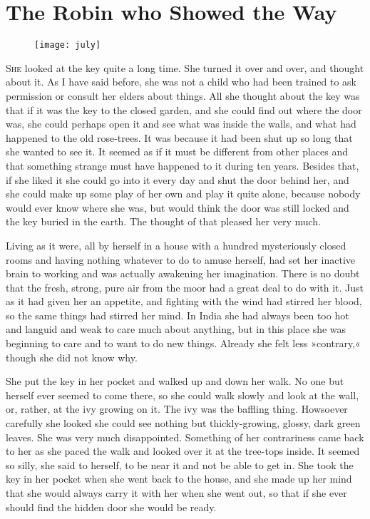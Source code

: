 \chapter{The Robin who Showed the Way} 
	
\begin{figure}[t!]
\centering
\texttt{[image: july]}
\end{figure}

 \lettrine[lines=6]{S}{he} looked at the key quite a long time. She turned it over and over, and thought about it. As I have said before, she was not a child who had been trained to ask permission or consult her elders about things. All she thought about the key was that if it was the key to the closed garden, and she could find out where the door was, she could perhaps open it and see what was inside the walls, and what had happened to the old rose-trees. It was because it had been shut up so long that she wanted to see it. It seemed as if it must be different from other places and that something strange must have happened to it during ten years. Besides that, if she liked it she could go into it every day and shut the door behind her, and she could make up some play of her own and play it quite alone, because nobody would ever know where she was, but would think the door was still locked and the key buried in the earth. The thought of that pleased her very much.

Living as it were, all by herself in a house with a hundred mysteriously closed rooms and having nothing whatever to do to amuse herself, had set her inactive brain to working and was actually awakening her imagination. There is no doubt that the fresh, strong, pure air from the moor had a great deal to do with it. Just as it had given her an appetite, and fighting with the wind had stirred her blood, so the same things had stirred her mind. In India she had always been too hot and languid and weak to care much about anything, but in this place she was beginning to care and to want to do new things. Already she felt less »contrary,« though she did not know why.

She put the key in her pocket and walked up and down her walk. No one but herself ever seemed to come there, so she could walk slowly and look at the wall, or, rather, at the ivy growing on it. The ivy was the baffling thing. Howsoever carefully she looked she could see nothing but thickly-growing, glossy, dark green leaves. She was very much disappointed. Something of her contrariness came back to her as she paced the walk and looked over it at the tree-tops inside. It seemed so silly, she said to herself, to be near it and not be able to get in. She took the key in her pocket when she went back to the house, and she made up her mind that she would always carry it with her when she went out, so that if she ever should find the hidden door she would be ready.

